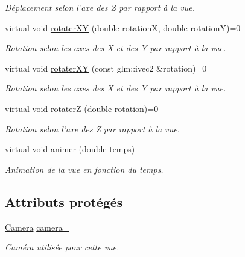 \begin{DoxyCompactItemize}
\begin{DoxyCompactList}\small\item\em Déplacement selon l'axe des Z par rapport à la vue. \end{DoxyCompactList}\item 
\hypertarget{classvue_1_1_vue_a07067586589d8a391a18c3e1a4e9482e}{virtual void \hyperlink{classvue_1_1_vue_a07067586589d8a391a18c3e1a4e9482e}{rotater\-X\-Y} (double rotation\-X, double rotation\-Y)=0}\label{classvue_1_1_vue_a07067586589d8a391a18c3e1a4e9482e}

\begin{DoxyCompactList}\small\item\em Rotation selon les axes des X et des Y par rapport à la vue. \end{DoxyCompactList}\item 
\hypertarget{classvue_1_1_vue_a39c80e5438dfe09f70baded5b1442b9a}{virtual void \hyperlink{classvue_1_1_vue_a39c80e5438dfe09f70baded5b1442b9a}{rotater\-X\-Y} (const glm\-::ivec2 \&rotation)=0}\label{classvue_1_1_vue_a39c80e5438dfe09f70baded5b1442b9a}

\begin{DoxyCompactList}\small\item\em Rotation selon les axes des X et des Y par rapport à la vue. \end{DoxyCompactList}\item 
\hypertarget{classvue_1_1_vue_a0b06a4b099a3bb953a672d84295556d9}{virtual void \hyperlink{classvue_1_1_vue_a0b06a4b099a3bb953a672d84295556d9}{rotater\-Z} (double rotation)=0}\label{classvue_1_1_vue_a0b06a4b099a3bb953a672d84295556d9}

\begin{DoxyCompactList}\small\item\em Rotation selon l'axe des Z par rapport à la vue. \end{DoxyCompactList}\item 
virtual void \hyperlink{classvue_1_1_vue_ab6435f4fa09e00dd2f96af3ff45dc60a}{animer} (double temps)
\begin{DoxyCompactList}\small\item\em Animation de la vue en fonction du temps. \end{DoxyCompactList}\end{DoxyCompactItemize}
\subsection*{Attributs protégés}
\begin{DoxyCompactItemize}
\item 
\hypertarget{classvue_1_1_vue_a9b2dabe1d684a33032343dfff03b929d}{\hyperlink{classvue_1_1_camera}{Camera} \hyperlink{classvue_1_1_vue_a9b2dabe1d684a33032343dfff03b929d}{camera\-\_\-}}\label{classvue_1_1_vue_a9b2dabe1d684a33032343dfff03b929d}

\begin{DoxyCompactList}\small\item\em Caméra utilisée pour cette vue. \end{DoxyCompactList}\end{DoxyCompactItemize}


